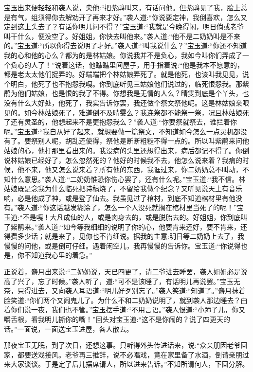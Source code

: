 \begin{parag}
    宝玉出来便轻轻和袭人说，央他:“把紫鹃叫来，有话问他。但紫鹃见了我，脸上总是有气，组须得你去解劝开了再来才好。”袭人道:“你说要定神，我倒喜欢，怎么又定到这上头去了？有话你明儿问不得？”宝玉道:“我就是今晚得闲，明日倘或老爷叫干什么，便没空了。好姐姐，你快去叫他来。”袭人道:“他不是二奶奶叫是不来的。”宝玉道:“所以你得去说明了才好。”袭人道:“叫我说什么？”宝玉道:“你还不知道我的心和他的心么？都为的是林姑娘。你说我并不是负心，我如今叫你们弄成了一个负心的人了！”说着这话，他瞧瞧里间屋子，用手指着说:“他是我本不愿意的，都是老太太他们捉弄的。好端端把个林姑娘弄死了。就是他死，也该叫我见见，说个明白，他死了也不抱怨我嘎。你到底听见三姑娘他们说过的，临死恨怨我。那紫鹃为他们姑娘，也是恨的我了不得。你想我是无情的人么？晴雯到底是个丫头，也没有什么大好处，他死了，我实告诉你罢，我还做个祭文祭他呢。这是林姑娘亲眼见的。如今林姑娘死了，难道倒不及晴雯么？我连祭都不能祭一祭，况且林姑娘死了还有灵圣的，他想起来不是更抱怨我么？”袭人道:“你要祭就祭去，谁拦着你呢。”宝玉道:“我自从好了起来，就想要做一篇祭文，不知道如今怎么一点灵机都没有了。要祭别人呢，胡乱还使得，祭他是断断粗糙不得一点的。所以叫紫鹃来问他姑娘的心，他打那里看出来的。我没病的头里还想得出来，病后都记不得了。你倒说林姑娘已经好了，怎么忽然死的？他好的时候我不去，他怎么说来着？我病的时候，他不来，他又怎么说来着？所有他的东西，我诓过来，你二奶奶总不叫动，不知什么意思。”袭人道:“二奶奶惟恐你伤心罢了，还有什么呢。”宝玉道:“我不信。林姑娘既是念我为什么临死把诗稿烧了，不留给我做个纪念？又听见说天上有音乐响，必是他成了神，或是登了仙去。我虽见过了棺材，到底不知道棺材里有他没有。”袭人道:“你这话越发糊涂了，怎么一个人没死就搁在棺材里当死了的呢！”宝玉道:“不是嘎！大凡成仙的人，或是肉身去的，或是脱胎去的。好姐姐，你到底叫了紫鹃来。”袭人道:“如今等我细细的说明了你的心，他要肯来还好，要不肯来，还得费多少话；就是来了，见你也不肯细说。据我的主意:明日等二奶奶上去了，我慢慢的问他，或是倒可仔细。遇着闲空儿，我再慢慢的告诉你。宝玉道:“你说得也是，你不知道我心里的着急。”
\end{parag}


\begin{parag}
    正说着，麝月出来说:“二奶奶说，天已四更了，请二爷进去睡罢，袭人姐姐必是说高了兴了，忘了时候。”袭人听了，道:“可不是该睡了，有话明儿再说罢。”宝玉无奈，只得进去，又向袭人耳语道:“明儿好歹别忘了。”袭人笑道:“知道了。”麝月抹着脸笑道:“你们两个又闹鬼儿了。为什么不和二奶奶说明了，就到袭人那边睡去？由着你们说一夜，我们也不管。”宝玉摆手道:“不用言语。”袭人恨道:“小蹄子儿，你又嚼舌根，看我明儿撕你的嘴！”回头对宝玉道:“这不是你闹的？说了四更天的话。”一面说，一面送宝玉进屋，各人散去。
\end{parag}


\begin{parag}
    那夜宝玉无眠，到了次日，还想这事。只听得外头传进话来，说:“众亲朋因老爷回家，都要送戏接风。老爷再三推辞，说不必唱戏，竟在家里备了水酒，倒请亲朋过来大家谈谈。于是定了后儿摆席请人，所以进来告诉。”不知所请何人，下回分解。
\end{parag}